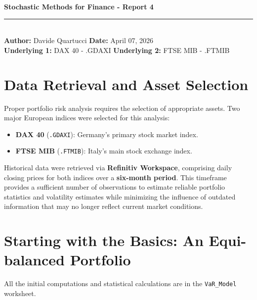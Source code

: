 \documentclass{report}
\begin{document}
\pagestyle{fancy}
\fancyhf{}
\renewcommand{\headrulewidth}{0.4pt}
\setlength{\headheight}{14pt}
\thispagestyle{plain} 

\begin{flushleft}
    {\large \textbf{Stochastic Methods for Finance - Report 4}} \\
    \rule{\textwidth}{0.4pt} \\ 
    \textbf{Author:} Davide Quartucci \hfill \textbf{Date:} April 07, 2026 \\
    \textbf{Underlying 1:} DAX 40 - .GDAXI \hfill \textbf{Underlying 2:} FTSE MIB - .FTMIB \\
\end{flushleft}

\begin{center}
\end{center}

\section{Data Retrieval and Asset Selection}
Proper portfolio risk analysis requires the selection of appropriate assets. Two major European indices were selected for this analysis:
\begin{itemize}
    \item \textbf{DAX 40} (\texttt{.GDAXI}): Germany's primary stock market index.
    \item \textbf{FTSE MIB} (\texttt{.FTMIB}): Italy's main stock exchange index.
\end{itemize}

Historical data were retrieved via \textbf{Refinitiv Workspace}, comprising daily closing prices for both indices over a \textbf{six-month period}. This timeframe provides a sufficient number of observations to estimate reliable portfolio statistics and volatility estimates while minimizing the influence of outdated information that may no longer reflect current market conditions.

\section{Starting with the Basics: An Equi-balanced Portfolio}
All the initial computations and statistical calculations are in the \texttt{VaR\_Model} worksheet. 
\end{document}
